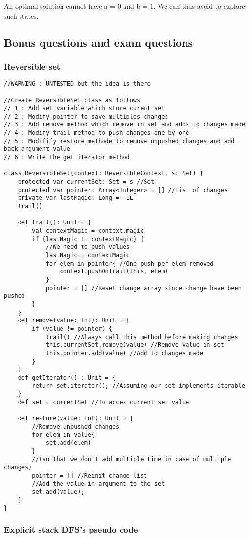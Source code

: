 An optimal solution cannot have a = 0 and b = 1. 
We can thus avoid to explore such states.

\subsection{Bonus questions and exam questions}

\subsubsection{Reversible set}

\begin{lstlisting}
//WARNING : UNTESTED but the idea is there

//Create ReversibleSet class as follows
// 1 : Add set variable which store curent set
// 2 : Modify pointer to save multiples changes
// 3 : Add remove method which remove in set and adds to changes made
// 4 : Modify trail method to push changes one by one
// 5 : Modifify restore methode to remove unpushed changes and add back argument value
// 6 : Write the get iterator method

class ReversibleSet(context: ReversibleContext, s: Set) {
	protected var currentSet: Set = s //Set
	protected var pointer: Array<Integer> = [] //List of changes
	private var lastMagic: Long = -1L
	trail()
	
	def trail(): Unit = {
		val contextMagic = context.magic
		if (lastMagic != contextMagic) {
			//We need to push values
			lastMagic = contextMagic
			for elem in pointer{ //One push per elem removed
				context.pushOnTrail(this, elem)
			}
			pointer = [] //Reset change array since change have been pushed
		}
	}
	def remove(value: Int): Unit = {
		if (value != pointer) {
			trail() //Always call this method before making changes
			this.currentSet.remove(value) //Remove value in set
			this.pointer.add(value) //Add to changes made
		}
	}
	def getIterator() : Unit = {
		return set.iterator(); //Assuming our set implements iterable
	}
	def set = currentSet //To acces current set value
	
	def restore(value: Int): Unit = {
		//Remove unpushed changes
		for elem in value{
			set.add(elem)
		}
		//(so that we don't add multiple time in case of multiple changes)
		pointer = [] //Reinit change list 
		//Add the value in argument to the set
		set.add(value);
	}
}
\end{lstlisting}

\subsubsection{Explicit stack DFS's pseudo code}

